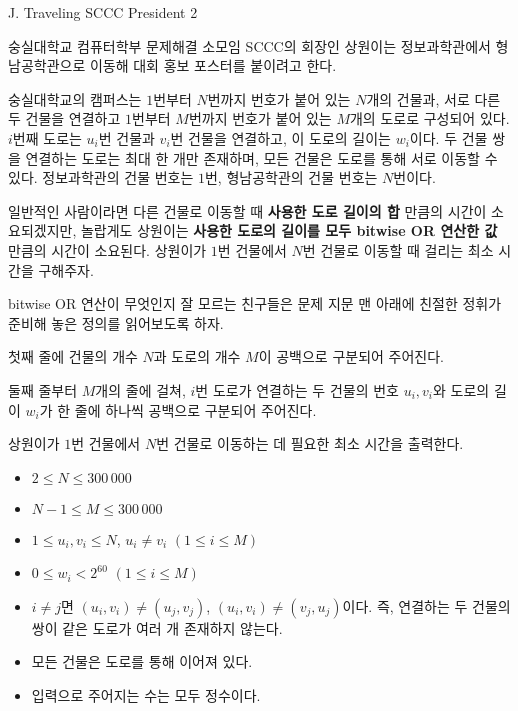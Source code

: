 \def\probtitle{Traveling SCCC President 2}
\def\probno{J} %

\begin{problem}{\probno{}. \probtitle{}}

숭실대학교 컴퓨터학부 문제해결 소모임 SCCC의 회장인 상원이는 정보과학관에서 형남공학관으로 이동해 대회 홍보 포스터를 붙이려고 한다.

숭실대학교의 캠퍼스는 $1$번부터 $N$번까지 번호가 붙어 있는 $N$개의 건물과, 서로 다른 두 건물을 연결하고 $1$번부터 $M$번까지 번호가 붙어 있는 $M$개의 도로로 구성되어 있다. $i$번째 도로는 $u_i$번 건물과 $v_i$번 건물을 연결하고, 이 도로의 길이는 $w_i$이다. 두 건물 쌍을 연결하는 도로는 최대 한 개만 존재하며, 모든 건물은 도로를 통해 서로 이동할 수 있다. 정보과학관의 건물 번호는 $1$번, 형남공학관의 건물 번호는 $N$번이다.

일반적인 사람이라면 다른 건물로 이동할 때 \textbf{사용한 도로 길이의 합} 만큼의 시간이 소요되겠지만, 놀랍게도 상원이는 \textbf{사용한 도로의 길이를 모두 bitwise OR 연산한 값} 만큼의 시간이 소요된다. 상원이가 $1$번 건물에서 $N$번 건물로 이동할 때 걸리는 최소 시간을 구해주자.

bitwise OR 연산이 무엇인지 잘 모르는 친구들은 문제 지문 맨 아래에 친절한 정휘가 준비해 놓은 정의를 읽어보도록 하자.




\InputFile

첫째 줄에 건물의 개수 $N$과 도로의 개수 $M$이 공백으로 구분되어 주어진다.

둘째 줄부터 $M$개의 줄에 걸쳐, $i$번 도로가 연결하는 두 건물의 번호 $u_i, v_i$와 도로의 길이 $w_i$가 한 줄에 하나씩 공백으로 구분되어 주어진다.

\OutputFile

상원이가 $1$번 건물에서 $N$번 건물로 이동하는 데 필요한 최소 시간을 출력한다.

\Constraints

\begin{itemize}[topsep=0pt,noitemsep]
    \item $2 \leq N \leq 300\,000$
    \item $N-1 \leq M \leq 300\,000$
    \item $1 \leq u_i, v_i \leq N$, $u_i \neq v_i$ $(1 \leq i \leq M)$
    \item $0 \leq w_i < 2^{60}$ $(1 \leq i \leq M)$
    \item $i \neq j$면 $(u_i, v_i) \neq (u_j, v_j)$, $(u_i, v_i) \neq (v_j, u_j)$이다. 즉, 연결하는 두 건물의 쌍이 같은 도로가 여러 개 존재하지 않는다.
    \item 모든 건물은 도로를 통해 이어져 있다.
    \item 입력으로 주어지는 수는 모두 정수이다.
    

\end{itemize}
\end{problem}
